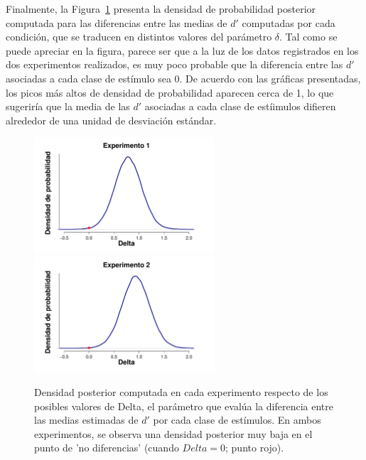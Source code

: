 Finalmente, la Figura~\ref{fig:Delta} presenta la densidad de probabilidad posterior computada para las diferencias entre las medias de $d'$ computadas por cada condición, que se traducen en distintos valores del parámetro $\delta$. Tal como se puede apreciar en la figura, parece ser que a la luz de los datos registrados en los dos experimentos realizados, es muy poco probable que la diferencia entre las $d'$ asociadas a cada clase de estímulo sea 0. De acuerdo con las gráficas presentadas, los picos más altos de densidad de probabilidad aparecen cerca de 1, lo que sugeriría que la media de las $d'$ asociadas a cada clase de estíimulos difieren alrededor de una unidad de desviación estándar.\\

\begin{figure}[th]
\centering
\includegraphics[width=0.6\textwidth]{Figures/MDelta_DensidadDelta_E1}\\
\includegraphics[width=0.6\textwidth]{Figures/MDelta_DensidadDelta_E2}\\
\caption[Modelo Delta: Densidad posterior de los valores estimados para el parámetro Delta en cada Experimento]{Densidad posterior computada en cada experimento respecto de los posibles valores de Delta, el parámetro que evalúa la diferencia entre las medias estimadas de $d'$ por cada clase de estímulos. En ambos experimentos, se observa una densidad posterior muy baja en el punto de 'no diferencias' (cuando $Delta=0$; punto rojo).} 
\label{fig:Delta}
\end{figure}

